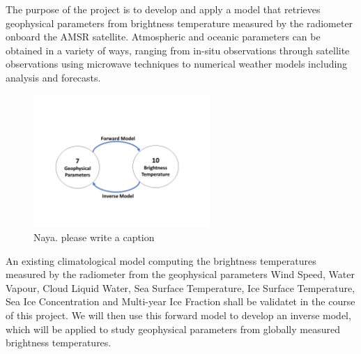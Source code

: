 \documentclass[11pt, a4paper]{article}
\begin{document}
The purpose of the project is to develop and apply a model that retrieves geophysical parameters from brightness temperature measured by the radiometer onboard the AMSR satellite. Atmospheric and oceanic parameters can be obtained in a variety of ways, ranging from in-situ observations through satellite observations using microwave techniques to numerical weather models including analysis and forecasts.

\begin{figure}[h]
   \centering
   \includegraphics[width=0.6\textwidth]{Flowchart.png}
   \caption{Naya. please write a caption}
   \label{fig:flow}
\end{figure}

An existing climatological model computing the brightness temperatures measured by the radiometer from the geophysical parameters Wind Speed, Water Vapour, Cloud Liquid Water, Sea Surface Temperature, Ice Surface Temperature, Sea Ice Concentration and Multi-year Ice Fraction shall be validatet in the course of this project. We will then use this forward model to develop an inverse model, which will be applied to study geophysical parameters from globally measured brightness temperatures.
\newline

\end{document}
